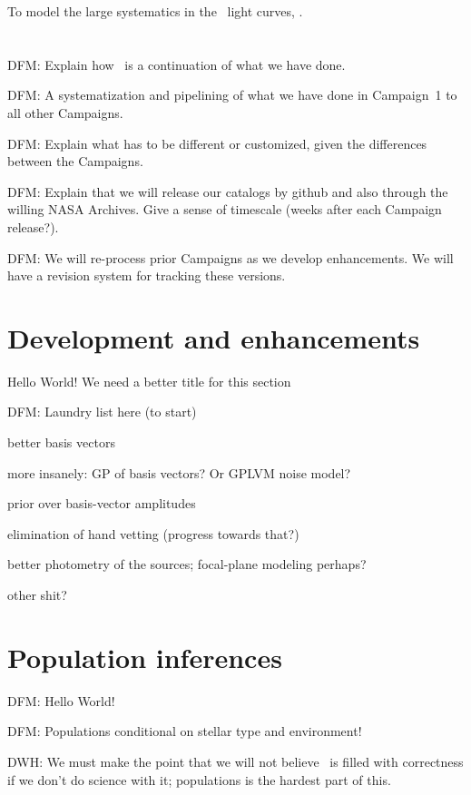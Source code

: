\documentclass[12pt,preprint]{aastex}
\begin{document}
To model the large systematics in the \ketu\ light curves,
\citet{Foreman-Mackey:2015}.


\section{\thecatalog}

DFM:  Explain how \thecatalog\ is a continuation of what we have done.

DFM:  A systematization and pipelining of what we have done in Campaign~1 to
all other Campaigns.

DFM:  Explain what has to be different or customized, given the differences
between the Campaigns.

DFM:  Explain that we will release our catalogs by github and also through
the willing NASA Archives.
Give a sense of timescale (weeks after each Campaign release?).

DFM:  We will re-process prior Campaigns as we develop enhancements.
We will have a revision system for tracking these versions.

\section{Development and enhancements}

Hello World!  We need a better title for this section

DFM:  Laundry list here (to start)

better basis vectors

more insanely: GP of basis vectors?  Or GPLVM noise model?

prior over basis-vector amplitudes

elimination of hand vetting (progress towards that?)

better photometry of the sources; focal-plane modeling perhaps?

other shit?

\section{Population inferences}

DFM:  Hello World!

DFM:  Populations conditional on stellar type and environment!

DWH:  We must make the point that we will not believe \thecatalog\ is filled
with correctness if we don't do science with it; populations is the hardest
part of this.
\end{document}
